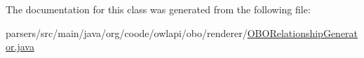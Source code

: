 The documentation for this class was generated from the following file\-:\begin{DoxyCompactItemize}
\item 
parsers/src/main/java/org/coode/owlapi/obo/renderer/\hyperlink{_o_b_o_relationship_generator_8java}{O\-B\-O\-Relationship\-Generator.\-java}\end{DoxyCompactItemize}
